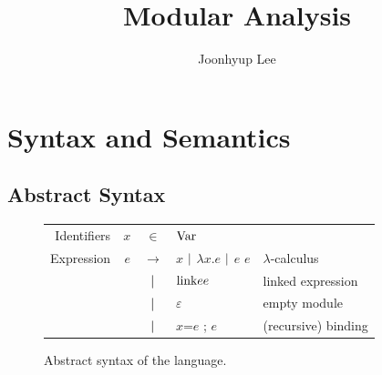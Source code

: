 \documentclass{article}
\title{Modular Analysis}
\author{Joonhyup Lee}
\begin{document}
\maketitle
\section{Syntax and Semantics}
\subsection{Abstract Syntax}
\begin{figure}[htb]
  \centering
  \begin{tabular}{rrcll}
    Identifiers & $x$ & $\in$         & $\text{Var}$                                                      \\
    Expression  & $e$ & $\rightarrow$ & $x$ $|$ $\lambda x.e$ $|$ $e$ $e$ & $\lambda$-calculus  \\
                &     & $|$       & $\text{link}{e}{e}$                             & linked expression   \\
                &     & $|$       & $\varepsilon$                             & empty module        \\
                &     & $|$       & $x\texttt{=}e$ ; $e$                      & (recursive) binding
  \end{tabular}
  \caption{Abstract syntax of the language.}
  \label{fig:syntax}
\end{figure}
\end{document}
